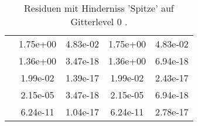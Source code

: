 \begin{table}
\begin{tabular}{c|cc|cc|}
\multicolumn{1}{|c|}{} & \multicolumn{1}{|c|}{  1.75e+00} & \multicolumn{1}{|c|}{  4.83e-02} & \multicolumn{1}{|c|}{  1.75e+00} & \multicolumn{1}{|c|}{  4.83e-02} \\ 
\multicolumn{1}{|c|}{} & \multicolumn{1}{|c|}{  1.36e+00} & \multicolumn{1}{|c|}{  3.47e-18} & \multicolumn{1}{|c|}{  1.36e+00} & \multicolumn{1}{|c|}{  6.94e-18} \\ 
\multicolumn{1}{|c|}{} & \multicolumn{1}{|c|}{  1.99e-02} & \multicolumn{1}{|c|}{  1.39e-17} & \multicolumn{1}{|c|}{  1.99e-02} & \multicolumn{1}{|c|}{  2.43e-17} \\ 
\multicolumn{1}{|c|}{} & \multicolumn{1}{|c|}{  2.15e-05} & \multicolumn{1}{|c|}{  3.47e-18} & \multicolumn{1}{|c|}{  2.15e-05} & \multicolumn{1}{|c|}{  6.94e-18} \\ 
\multicolumn{1}{|c|}{} & \multicolumn{1}{|c|}{  6.24e-11} & \multicolumn{1}{|c|}{  1.04e-17} & \multicolumn{1}{|c|}{  6.24e-11} & \multicolumn{1}{|c|}{  2.78e-17} \\ 
\hline 
\end{tabular}\caption{Residuen mit Hinderniss 'Spitze' auf Gitterlevel 0 .}\label{tab:Residuum_Spitze_level0}
\end{table} 
